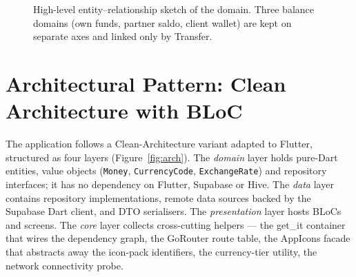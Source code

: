 \begin{figure}[h]
  \centering
  \caption{High-level entity--relationship sketch of the domain. Three balance domains (own funds, partner saldo, client wallet) are kept on separate axes and linked only by Transfer.}
  \label{fig:erd}
\end{figure}

\section{Architectural Pattern: Clean Architecture with BLoC}
\label{sec:cleanarch2}

The application follows a Clean-Architecture variant adapted to Flutter, structured as four layers (Figure~\ref{fig:arch}). The \emph{domain} layer holds pure-Dart entities, value objects (\texttt{Money}, \texttt{CurrencyCode}, \texttt{ExchangeRate}) and repository interfaces; it has no dependency on Flutter, Supabase or Hive. The \emph{data} layer contains repository implementations, remote data sources backed by the Supabase Dart client, and DTO serialisers. The \emph{presentation} layer hosts BLoCs and screens. The \emph{core} layer collects cross-cutting helpers --- the get\_it container that wires the dependency graph, the GoRouter route table, the AppIcons facade that abstracts away the icon-pack identifiers, the currency-tier utility, the network connectivity probe.

